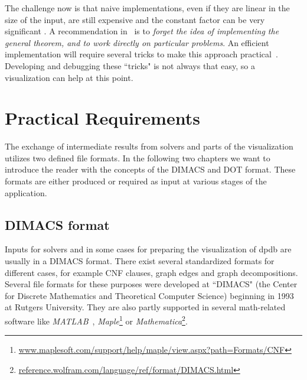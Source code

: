 \documentclass[a4paper, 12pt, bibliography=totoc]{scrartcl}
\begin{document}
\noindent

The challenge now is that naive implementations, even if they are linear in the size of the input, are still expensive and the constant factor can be very significant \cite{Courcelle2012,KNEIS200965,MetatheoremsforRestrictionsofTreewidth}. 
A recommendation in~\cite{FiniteAutomata10} is to \textit{forget the idea of implementing the general theorem, and to work directly on particular problems}. An efficient implementation will require several tricks to make this approach practical~\cite{DiplomarbeitZisser,fichtegpusat2}. Developing and debugging these ``tricks" is not always that easy, so a visualization can help at this point.\smallskip 



\section{Practical Requirements}\label{sec:practicalreq}
The exchange of intermediate results from solvers and parts of the visualization utilizes two defined file formats. In the following two chapters we want to introduce the reader with the concepts of the DIMACS and DOT format. These formats are either produced or required as input at various stages of the application.
  
\subsection{DIMACS format}

Inputs for solvers and in some cases for preparing the visualization of dpdb are usually in a DIMACS format. There exist several standardized formats for different cases, for example CNF clauses, graph edges and graph decompositions.
Several file formats for these purposes were developed at ``DIMACS" (the Center for Discrete Mathematics and Theoretical Computer Science) \cite{dimacsimplcha} beginning in 1993 at Rutgers University.
They are also partly supported in several math-related software like \textit{MATLAB}~\cite{matlabcnf}, \textit{Maple}\footnote{\url{www.maplesoft.com/support/help/maple/view.aspx?path=Formats/CNF}} or \textit{Mathematica}\footnote{\url{reference.wolfram.com/language/ref/format/DIMACS.html}}.
\end{document}
